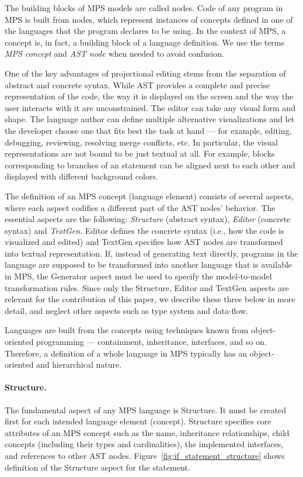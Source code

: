 The building blocks of MPS models are called nodes.
Code of any program in MPS is built from nodes, which represent instances of concepts defined in one of the languages that the program declares to be using.
 In the context of MPS, a concept is, in fact, a building block of a language definition.
We use the terms \emph{MPS concept} and \emph{AST node} when needed to avoid confusion.

One of the key advantages of projectional editing stems from the separation of abstract and concrete syntax.
While AST provides a complete and precise representation of the code, the way it is displayed on the screen and the way the user interacts with it are unconstrained.
The editor can take any visual form and shape.
The language author can define multiple alternative visualizations and let the developer choose one that fits best the task at hand --- for example, editing, debugging, reviewing, resolving merge conflicts, etc.
In particular, the visual representations are not bound to be just textual at all.
For example, blocks corresponding to branches of an  statement can be aligned next to each other and displayed with different background colors.

The definition of an MPS concept (language element) consists of several aspects, where each aspect codifies a different part of the AST nodes' behavior.
The essential aspects are the following: \emph{Structure} (abstract syntax), \emph{Editor} (concrete syntax) and \emph{TextGen}.
Editor defines the concrete syntax (i.e., how the code is visualized and edited) and TextGen specifies how AST nodes are transformed into textual representation.
If, instead of generating text directly, programs in the language are supposed to be transformed into another language that is available in MPS, the Generator aspect must be used to specify the model-to-model transformation rules.
Since only the Structure, Editor and TextGen aspects are relevant for the contribution of this paper, we describe these three below in more detail, and neglect other aspects such as type system and data-flow.

Languages are built from the concepts using techniques known from object-oriented programming --- containment, inheritance, interfaces, and so on.
Therefore, a definition of a whole language in MPS typically has an object-oriented and hierarchical nature.

\paragraph{Structure.}
The fundamental aspect of any MPS language is Structure.
It must be created first for each intended language element (concept).
Structure specifies core attributes of an MPS concept such as the name, inheritance relationships, child concepts (including their types and cardinalities), the implemented interfaces, and references to other AST nodes.
Figure~\ref{fig:if_statement_structure} shows definition of the Structure aspect for the  statement.

